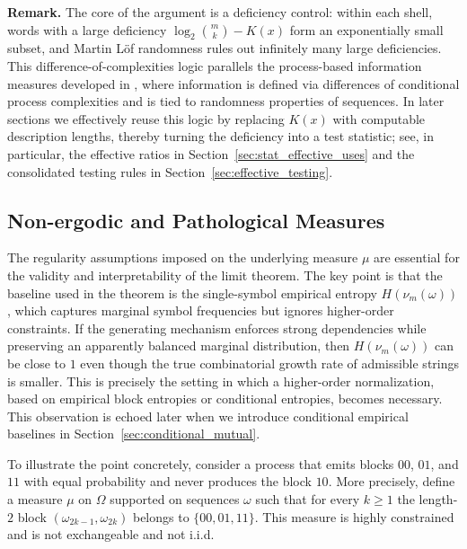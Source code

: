 \documentclass[12pt]{article}
\begin{document}
\medskip
\noindent
{\bf Remark.}
The core of the argument is a deficiency control: within each shell, words with a large deficiency $\log_2\binom{m}{k}-K(x)$ form an exponentially small subset, and Martin L\"of randomness rules out infinitely many large deficiencies. This difference-of-complexities logic parallels the process-based information measures developed in \citep{Vidakovic1983Process}, where information is defined via differences of conditional process complexities and is tied to randomness properties of sequences. In later sections we effectively reuse this logic by replacing $K(x)$ with computable description lengths, thereby turning the deficiency into a test statistic; see, in particular, the effective ratios in Section~\ref{sec:stat_effective_uses} and the consolidated testing rules in Section~\ref{sec:effective_testing}.

\subsection{Non-ergodic and Pathological Measures}
\label{sec:pathological}

The regularity assumptions imposed on the underlying measure $\mu$ are essential for the validity and interpretability of the limit theorem. The key point is that the baseline used in the theorem is the single-symbol empirical entropy $H(\nu_m(\omega))$, which captures marginal symbol frequencies but ignores higher-order constraints. If the generating mechanism enforces strong dependencies while preserving an apparently balanced marginal distribution, then $H(\nu_m(\omega))$ can be close to $1$ even though the true combinatorial growth rate of admissible strings is smaller. This is precisely the setting in which a higher-order normalization, based on empirical block entropies or conditional entropies, becomes necessary. This observation is echoed later when we introduce conditional empirical baselines in Section~\ref{sec:conditional_mutual}.

To illustrate the point concretely, consider a process that emits blocks $00$, $01$, and $11$ with equal probability and never produces the block $10$. More precisely, define a measure $\mu$ on $\Omega$ supported on sequences $\omega$ such that for every $k\ge 1$ the length-$2$ block $(\omega_{2k-1},\omega_{2k})$ belongs to $\{00,01,11\}$. This measure is highly constrained and is not exchangeable and not i.i.d.
\end{document}

